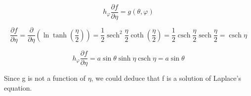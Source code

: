 \documentclass[12pt]{article}
\DeclareMathOperator{\sech}{sech}
\DeclareMathOperator{\csch}{csch}
\begin{document}
\[
    h_\varphi \frac{\partial f}{\partial \eta} = g(\theta, \varphi)
\]

\[
    \frac{\partial f}{\partial \eta}
    = \frac{\partial}{\partial \eta}\left(\ln \tanh \left(\frac{\eta}{2}\right)\right)
    = \frac{1}{2} \sech^2 \frac{\eta}{2} \coth \left(\frac{\eta}{2}\right)
    = \frac{1}{2} \csch \frac{\eta}{2} \sech \frac{\eta}{2}
    = \csch \eta
\]

\[
    h_\varphi \frac{\partial f}{\partial \eta}
    = a \sin \theta \sinh \eta \csch \eta
    = a \sin \theta
\]

Since g is not a function of \(\eta \), we could deduce that f is a solution of Laplace's equation.

\newpage


\nocite{El-Deeb_PEU-218_Assignments}
\end{document}
